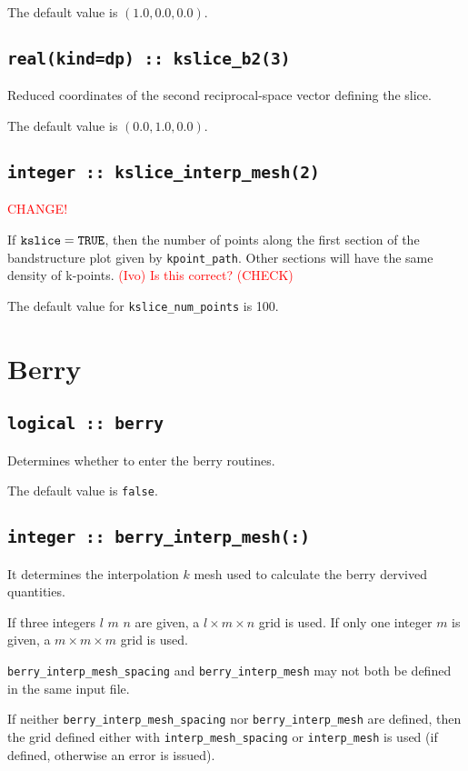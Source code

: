 The default value is $(1.0,0.0,0.0)$.

\subsection[kslice\_corner]{\tt real(kind=dp) :: kslice\_b2(3)}
Reduced coordinates of the second reciprocal-space vector 
defining the slice.

The default value is $(0.0,1.0,0.0)$.

\subsection[kslice\_num\_points]{\tt integer :: kslice\_interp\_mesh(2)}

\textcolor{red}{CHANGE!}

If $\verb#kslice#=\verb#TRUE#$, then the number of points along
the first section of the bandstructure plot given by
\verb#kpoint_path#. Other sections will have the same density of
k-points. \textcolor{red}{(Ivo) Is this correct? (CHECK)}

The default value for \verb#kslice_num_points# is 100.


\clearpage
\section{Berry}

\subsection[berry]{\tt logical :: berry}
Determines whether to enter the berry routines.

The default value is \verb#false#.

\subsection[berry\_interp\_mesh]{\tt integer :: berry\_interp\_mesh(:)}
It determines the interpolation $k$ mesh used to calculate the berry
dervived quantities.

If three integers $l$ $m$ $n$ are given, a $l\times m\times n$ grid is used. If only one integer $m$ is given, a $m\times m\times m$ grid is used.

{\tt berry\_interp\_mesh\_spacing} and  {\tt berry\_interp\_mesh} may not both be defined in the same input file.

If neither {\tt berry\_interp\_mesh\_spacing} nor  {\tt berry\_interp\_mesh} are defined, then the grid defined either with {\tt interp\_mesh\_spacing} or {\tt interp\_mesh} is used (if defined, otherwise an error is issued).

